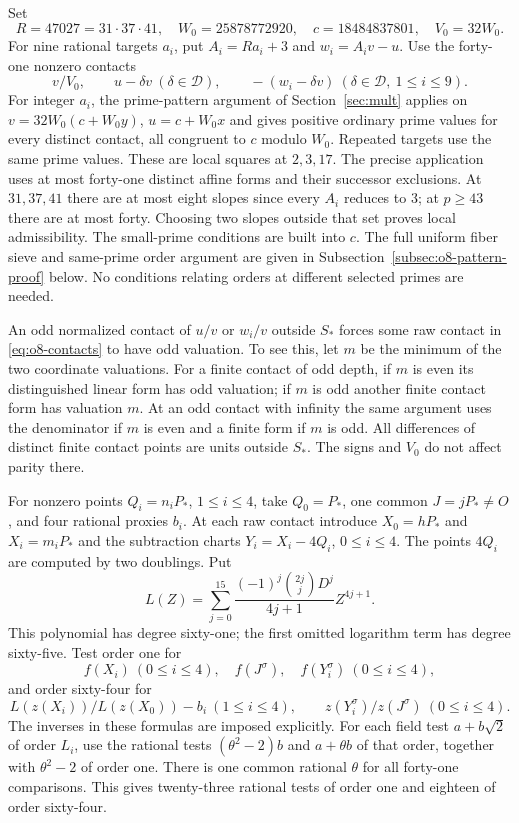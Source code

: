 Set
\[
 R=47027=31\cdot37\cdot41,\quad W_0=25878772920,
 \quad c=18484837801,\quad V_0=32W_0.
\]
For nine rational targets $a_i$, put $A_i=Ra_i+3$ and
$w_i=A_iv-u$. Use the forty-one nonzero contacts
\begin{equation}\label{eq:o8-contacts}
 v/V_0,\qquad u-\delta v\ (\delta\in\mathcal D),\qquad
 -(w_i-\delta v)\ (\delta\in\mathcal D,\ 1\le i\le9).
\end{equation}
For integer $a_i$, the prime-pattern argument of
Section~\ref{sec:mult} applies on
$v=32W_0(c+W_0y)$, $u=c+W_0x$ and gives positive ordinary prime
values for every distinct contact, all congruent to $c$ modulo $W_0$.
Repeated targets use the same prime values. These are local squares
at $2,3,17$. The precise application uses at most forty-one distinct
affine forms and their successor exclusions. At $31,37,41$ there are
at most eight slopes since every $A_i$ reduces to $3$; at $p\ge43$
there are at most forty. Choosing two slopes outside that set proves
local admissibility. The small-prime conditions are built into $c$.
The full uniform fiber sieve and same-prime order argument are given
in Subsection~\ref{subsec:o8-pattern-proof} below. No conditions relating orders at
different selected primes are needed.

An odd normalized contact of $u/v$ or $w_i/v$ outside $S_*$ forces
some raw contact in \eqref{eq:o8-contacts} to have odd valuation.
To see this, let $m$ be the minimum of the two coordinate valuations.
For a finite contact of odd depth, if $m$ is even its distinguished
linear form has odd valuation; if $m$ is odd another finite contact
form has valuation $m$. At an odd contact with infinity the same
argument uses the denominator if $m$ is even and a finite form if
$m$ is odd. All differences of distinct finite contact points are units
outside $S_*$. The signs and $V_0$ do not affect parity there.

For nonzero points $Q_i=n_iP_*$, $1\le i\le4$, take $Q_0=P_*$,
one common $J=jP_*\ne O$, and four rational proxies $b_i$.
At each raw contact introduce $X_0=hP_*$ and $X_i=m_iP_*$ and
the subtraction charts $Y_i=X_i-4Q_i$, $0\le i\le4$.
The points $4Q_i$ are computed by two doublings. Put
\[
 L(Z)=\sum_{j=0}^{15}
       \frac{(-1)^j\binom{2j}{j}D^j}{4j+1}Z^{4j+1}.
\]
This polynomial has degree sixty-one; the first omitted logarithm term
has degree sixty-five. Test order one for
\[
 f(X_i)\ (0\le i\le4),\quad f(J^\sigma),\quad
 f(Y_i^\sigma)\ (0\le i\le4),
\]
and order sixty-four for
\[
 L(z(X_i))/L(z(X_0))-b_i\ (1\le i\le4),\qquad
 z(Y_i^\sigma)/z(J^\sigma)\ (0\le i\le4).
\]
The inverses in these formulas are imposed explicitly. For each field
test $a+b\sqrt2$ of order $L_i$, use the rational tests
$(\theta^2-2)b$ and $a+\theta b$ of that order, together with
$\theta^2-2$ of order one. There is one common rational $\theta$
for all forty-one comparisons. This gives twenty-three rational tests
of order one and eighteen of order sixty-four.

